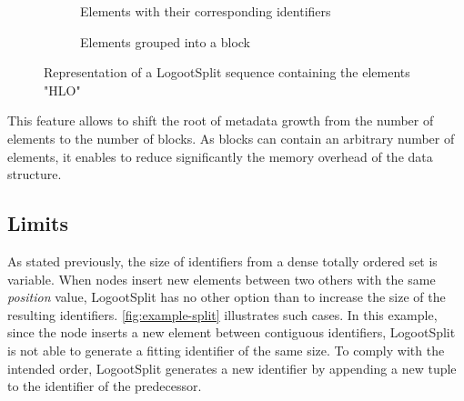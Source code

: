 \documentclass[sigplan,10pt,authorversion]{acmart}
\newcommand{\trm}[1]{\mathit{#1}}
\newcommand{\id}[3]{$\trm{#1}^{\trm{#2}}_{\trm{#3}}$}
\newcommand{\widthletter}{7mm}
\begin{document}
\begin{figure}[ht!]
    \begin{subfigure}{0.38\columnwidth}
        \centering
        \caption{Elements with their corresponding identifiers}
        \label{fig:logootsplit-seq-as-letters}
    \end{subfigure}
    \hspace{0.03\columnwidth}
    \begin{subfigure}{0.45\columnwidth}
        \centering
        \caption{Elements grouped into a block}
        \label{fig:logootsplit-seq-as-block}
    \end{subfigure}
    \caption{Representation of a LogootSplit sequence containing the elements "HLO"}
    \label{fig:logootsplit-seq}
\end{figure}

This feature allows to shift the root of metadata growth from the number of elements to the number of blocks.
As blocks can contain an arbitrary number of elements, it enables to reduce significantly the memory overhead of the data structure.

\subsection{Limits}

As stated previously, the size of identifiers from a dense totally ordered set is variable.
When nodes insert new elements between two others with the same \emph{position} value, LogootSplit has no other option than to increase the size of the resulting identifiers.
\autoref{fig:example-split} illustrates such cases.
In this example, since the node inserts a new element between contiguous identifiers, LogootSplit is not able to generate a fitting identifier of the same size.
To comply with the intended order, LogootSplit generates a new identifier by appending a new tuple to the identifier of the predecessor.
\end{document}
